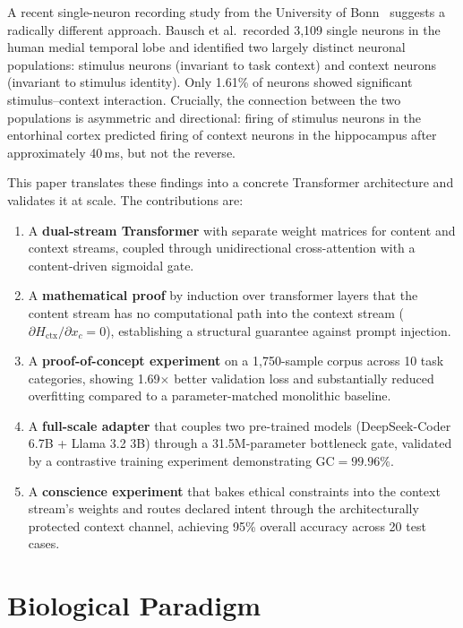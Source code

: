 \documentclass[11pt,a4paper]{article}
\theoremstyle{definition}
\begin{document}
A recent single-neuron recording study from the University of Bonn~\cite{bausch2026distinct} suggests a radically different approach. Bausch et al.\ recorded 3,109 single neurons in the human medial temporal lobe and identified two largely distinct neuronal populations: stimulus neurons (invariant to task context) and context neurons (invariant to stimulus identity). Only 1.61\% of neurons showed significant stimulus--context interaction. Crucially, the connection between the two populations is asymmetric and directional: firing of stimulus neurons in the entorhinal cortex predicted firing of context neurons in the hippocampus after approximately 40\,ms, but not the reverse.

This paper translates these findings into a concrete Transformer architecture and validates it at scale. The contributions are:
\begin{enumerate}
  \item A \textbf{dual-stream Transformer} with separate weight matrices for content and context streams, coupled through unidirectional cross-attention with a content-driven sigmoidal gate.
  \item A \textbf{mathematical proof} by induction over transformer layers that the content stream has no computational path into the context stream ($\partial H_{\text{ctx}} / \partial x_c = 0$), establishing a structural guarantee against prompt injection.
  \item A \textbf{proof-of-concept experiment} on a 1,750-sample corpus across 10 task categories, showing 1.69$\times$ better validation loss and substantially reduced overfitting compared to a parameter-matched monolithic baseline.
  \item A \textbf{full-scale adapter} that couples two pre-trained models (DeepSeek-Coder 6.7B + Llama 3.2 3B) through a 31.5M-parameter bottleneck gate, validated by a contrastive training experiment demonstrating $\text{GC} = 99.96\%$.
  \item A \textbf{conscience experiment} that bakes ethical constraints into the context stream's weights and routes declared intent through the architecturally protected context channel, achieving 95\% overall accuracy across 20 test cases.
\end{enumerate}

\section{Biological Paradigm}
\end{document}
